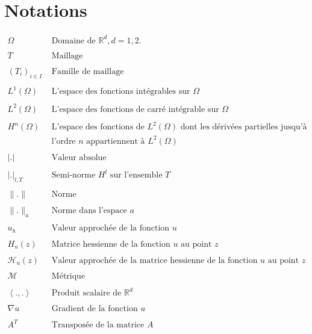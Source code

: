 \chapter*{Notations}
$
\begin{array}{ll}
\Omega\quad\quad\quad& \mbox{ Domaine de }\mathbb{R}^d,d=1,2.\\\\
T & \mbox{ Maillage }\\\\
(T_i)_{i\in I} & \mbox{ Famille de maillage }\\\\
L^1(\Omega) & \mbox{ L'espace des fonctions intégrables sur }\Omega\\\\
L^2(\Omega) & \mbox{ L'espace des fonctions de carré intégrable sur } \Omega\\\\
H^n(\Omega) & \mbox{ L’espace des fonctions de }L^2(\Omega) \mbox{ dont les dérivées partielles jusqu’à }\\
&\mbox{ l’ordre } n \mbox{ appartiennent à } L^2(\Omega)\\\\
|.| & \mbox{ Valeur absolue}\\\\
|.|_{l,T} & \mbox{ Semi-norme } H^l \mbox{ sur l’ensemble }T\\\\
\|.\| & \mbox{ Norme }\\\\
\|.\|_a & \mbox{ Norme dans l’espace } a\\\\
u_h & \mbox{ Valeur approchée de la fonction } u\\\\
H_u(z) &  \mbox{ Matrice hessienne de la fonction } u \mbox{ au point } z\\\\
\mathcal{H}_u(z) & \mbox{ Valeur approchée de la matrice hessienne de la fonction } u \mbox{ au point } z\\\\
\mathcal{M} & \mbox{ Métrique }\\\\
\left<.,.\right> & \mbox{ Produit scalaire de }\mathbb{R}^d\\\\
\nabla u & \mbox{ Gradient de la fonction } u\\\\
A^T & \mbox{ Transposée de la matrice } A\\\\
\end{array}
$
